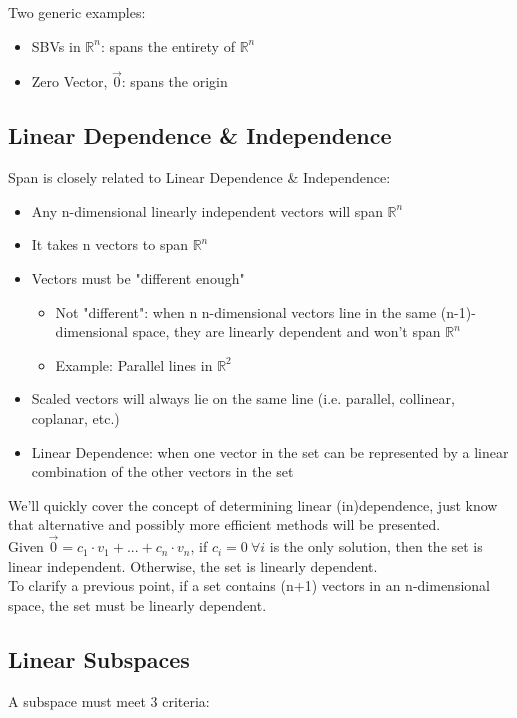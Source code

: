 Two generic examples:
\begin{itemize}
	\item SBVs in $\mathbb{R}^n$: spans the entirety of $\mathbb{R}^n$
	\item Zero Vector, $\vec{0}$: spans the origin
\end{itemize}

\subsection{Linear Dependence \& Independence}\label{concept1.7}
Span is closely related to Linear Dependence \& Independence:

\begin{itemize}
	\item Any n-dimensional linearly independent vectors will span $\mathbb{R}^n$
	\item It takes n vectors to span $\mathbb{R}^n$
	\item Vectors must be "different enough"
	\begin{itemize}
		\item Not "different": when n n-dimensional vectors line in the same (n-1)-dimensional space, they are linearly dependent and won't span $\mathbb{R}^n$
		\item Example: Parallel lines in $\mathbb{R}^2$
	\end{itemize}
	\item Scaled vectors will always lie on the same line (i.e. parallel, collinear, coplanar, etc.)
	\item Linear Dependence: when one vector in the set can be represented by a linear combination of the other vectors in the set
\end{itemize}

We'll quickly cover the concept of determining linear (in)dependence, just know that alternative and possibly more efficient methods will be presented.
\\

Given $\vec{0} = c_1 \cdot v_1 + . . . + c_n \cdot v_n$, if $c_i = 0 \: \forall i $ is the only solution, then the set is linear independent. Otherwise, the set is linearly dependent.
\\

To clarify a previous point, if a set contains (n+1) vectors in an n-dimensional space, the set must be linearly dependent.

\subsection{Linear Subspaces}\label{concept1.8}
A subspace must meet 3 criteria:

